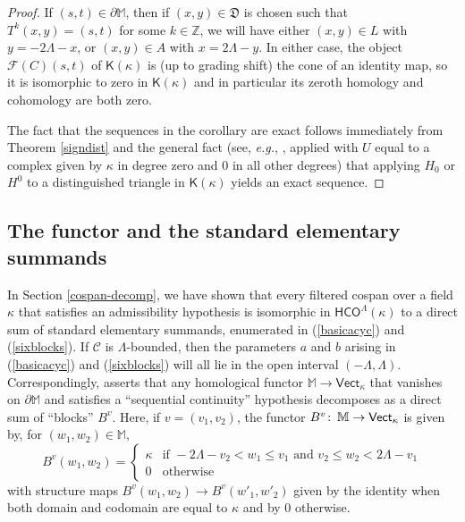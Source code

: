 \documentclass[11pt]{amsart}
\theoremstyle{definition}
\theoremstyle{remark}
\numberwithin{equation}{section}
\def\co{\colon\thinspace}
\def\Z{\mathbb{Z}}
\begin{document}
\begin{proof}
	If $(s,t)\in \partial\mathbb{M}$, then if $(x,y)\in\mathfrak{D}$ is chosen such that $T^k(x,y)=(s,t)$ for some $k\in \Z$, we will have either $(x,y)\in L$ with $y=-2\Lambda-x$, or $(x,y)\in A$ with $x=2\Lambda-y$.  In either case, the object $\mathcal{F}(C)(s,t)$ of $\mathsf{K}(\kappa)$ is (up to grading shift) the cone of an identity map, so it is isomorphic to zero in $\mathsf{K}(\kappa)$ and in particular its zeroth homology and cohomology are both zero.
	
	The fact that the sequences in the corollary are exact follows immediately from Theorem \ref{signdist} and the general fact (see, \emph{e.g.}, \cite[Proposition IV.1.3]{GM}, applied with $U$ equal to a complex given by $\kappa$ in degree zero and $0$ in all other degrees) that applying $H_0$ or $H^0$ to a distinguished triangle in $\mathsf{K}(\kappa)$ yields an exact sequence.	
\end{proof}



\subsection{The functor and the standard elementary summands} \label{elemfun}

In Section \ref{cospan-decomp}, we have shown that every filtered cospan over a field $\kappa$ that satisfies an admissibility hypothesis is isomorphic in $\mathsf{HCO}^{\Lambda}(\kappa)$ to a direct sum of standard elementary summands, enumerated in (\ref{basicacyc}) and (\ref{sixblocks}).  If $\mathcal{C}$ is $\Lambda$-bounded, then the parameters $a$ and $b$ arising in (\ref{basicacyc}) and (\ref{sixblocks}) will all lie in the open interval $(-\Lambda,\Lambda)$.  Correspondingly, \cite[Theorem 3.21]{BBF21} asserts that any homological functor $\mathbb{M}\to \mathsf{Vect}_{\kappa}$ that vanishes on $\partial\mathbb{M}$ and satisfies a ``sequential continuity'' hypothesis decomposes as a direct sum of ``blocks'' $B^v$.  Here, if $v=(v_1,v_2)$, the functor $B^v\co \mathbb{M}\to\mathsf{Vect}_{\kappa}$ is given by, for $(w_1,w_2)\in\mathbb{M}$, \begin{equation}\label{bvdef}
B^v(w_1,w_2)=\left\{\begin{array}{ll}\kappa & \mbox{if }-2\Lambda-v_2<w_1\leq v_1\mbox{ and }v_2\leq w_2<2\Lambda-v_1 \\ 0 & \mbox{otherwise}\end{array}  \right. 
\end{equation} with structure maps $B^v(w_1,w_2)\to B^v(w'_1,w'_2)$ given by the identity when both domain and codomain are equal to $\kappa$ and by $0$ otherwise.
\end{document}
